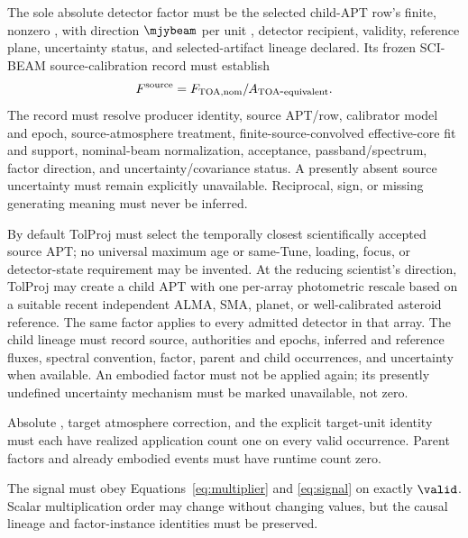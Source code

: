 \begin{description}[style=nextline]
\item[\Req{013}: absolute factor.]
  The sole absolute detector factor must be the selected child-APT row's finite,
  nonzero , with direction \(\mjybeam\) per unit , detector recipient,
  validity, reference plane, uncertainty status, and selected-artifact lineage
  declared. Its frozen SCI-BEAM source-calibration record must establish
  \begin{equation*}
  F^{\rm source}=F_{\rm TOA,nom}/A_{\rm TOA\mbox{-}equivalent}.
  \end{equation*}
  The record must resolve producer identity, source APT/row, calibrator model and epoch,
  source-atmosphere treatment, finite-source-convolved effective-core fit and
  support, nominal-beam normalization, acceptance, passband/spectrum, factor
  direction, and uncertainty/covariance status. A presently absent source
   uncertainty must remain explicitly unavailable.
  Reciprocal, sign, or missing generating meaning must never be inferred.

\item[\Req{014}: pointing-correction disposition.]
  By default TolProj must select the temporally closest scientifically
  accepted source APT; no universal maximum age or same-Tune, loading, focus,
  or detector-state requirement may be invented. At the reducing scientist's
  direction, TolProj may create a child APT with one per-array photometric
  rescale based on a suitable recent independent ALMA, SMA, planet, or
  well-calibrated asteroid reference. The same factor applies to every
  admitted detector in that array. The child lineage must record source,
  authorities and epochs, inferred and reference fluxes, spectral convention,
  factor, parent and child occurrences, and uncertainty when available. An
  embodied factor must not be applied again; its presently undefined
  uncertainty mechanism must be marked unavailable, not zero.

\item[\Req{015}: once-only application.]
  Absolute , target atmosphere correction, and the explicit
  target-unit identity must each have realized application count one on every
  valid occurrence. Parent factors and already embodied events must have
  runtime count zero.

\item[\Req{016}: canonical multiplier.]
  The signal must obey Equations~\eqref{eq:multiplier} and
  \eqref{eq:signal} on exactly \(\valid\). Scalar multiplication order may
  change without changing values, but the causal lineage and factor-instance
  identities must be preserved.


\end{description}
